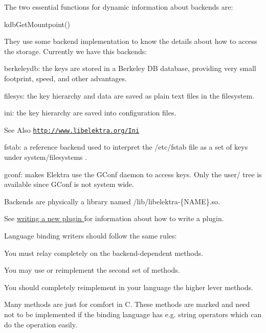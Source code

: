 The two essential functions for dynamic information about backends are\-:
\begin{DoxyItemize}
\item kdb\-Get\-Mountpoint()
\end{DoxyItemize}

They use some backend implementation to know the details about how to access the storage. Currently we have this backends\-:
\begin{DoxyItemize}
\item {\ttfamily berkeleydb\-:} the keys are stored in a Berkeley D\-B database, providing very small footprint, speed, and other advantages.
\item {\ttfamily filesys\-:} the key hierarchy and data are saved as plain text files in the filesystem.
\item {\ttfamily ini\-:} the key hierarchy are saved into configuration files. \begin{DoxySeeAlso}{See Also}
\href{http://www.libelektra.org/Ini}{\tt http\-://www.\-libelektra.\-org/\-Ini}
\end{DoxySeeAlso}

\item {\ttfamily fstab\-:} a reference backend used to interpret the {\ttfamily /etc/fstab} file as a set of keys under {\ttfamily system/filesystems} .
\item {\ttfamily gconf\-:} makes Elektra use the G\-Conf daemon to access keys. Only the {\ttfamily user/} tree is available since G\-Conf is not system wide.
\end{DoxyItemize}

Backends are physically a library named {\ttfamily /lib/libelektra-\/\{N\-A\-M\-E\}}.so.

See \hyperlink{group__plugin}{writing a new plugin } for information about how to write a plugin.

Language binding writers should follow the same rules\-:
\begin{DoxyItemize}
\item You must relay completely on the backend-\/dependent methods.
\item You may use or reimplement the second set of methods.
\item You should completely reimplement in your language the higher lever methods.
\item Many methods are just for comfort in C. These methods are marked and need not to be implemented if the binding language has e.\-g. string operators which can do the operation easily. 
\end{DoxyItemize}

